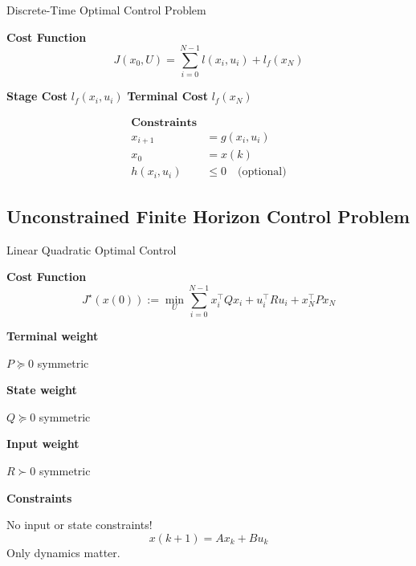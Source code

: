
\begin{sstTitleBox}{
		Discrete-Time Optimal Control Problem
	}
	\begin{sstOnlyFrame}
		\textbf{Cost Function}
		\vspace{-3mm}
		\begin{equation}
			J(x_0,U)= \sum_{i=0}^{N-1} l(x_i,u_i) + l_f(x_N)
		\end{equation}
		\begin{minipage}[t]{0.25\linewidth}
			\textbf{Stage Cost}
			$l_f(x_i,u_i)$
			\textbf{Terminal Cost}
			$l_f(x_N)$
		\end{minipage}
		\begin{minipage}[t]{0.59\linewidth}
			\vspace{-5.5mm}
			\begin{align*}
				\textbf{Constraints}                      \\
				x_{i+1}    & = g(x_i,u_i)                 \\
				x_0        & = x(k)                       \\
				h(x_i,u_i) & \le 0 \quad\text{(optional)}
			\end{align*}
		\end{minipage}
	\end{sstOnlyFrame}
\end{sstTitleBox}



\subsection{Unconstrained Finite Horizon Control Problem}

\begin{sstTitleBox}
	{Linear Quadratic Optimal Control}
	\begin{sstOnlyFrame}
		\textbf{Cost Function}
		\vspace{-3mm}
		\begin{equation}
			J^\star(x(0)) := \min_U
			\sum_{i=0}^{N-1}
			x_i^\top Q x_i + u_i^\top R u_i
			+x_N^\top P x_N
			\label{oc:lq-oc}
		\end{equation}

		\vspace{-2mm}
		\begin{minipage}[t]{0.33\linewidth}
			\textbf{Terminal weight}

			$P\succeq0$ symmetric

			\textbf{State weight}

			$Q\succeq0$ symmetric

			\textbf{Input weight}

			$R\succ0$ symmetric
		\end{minipage}
		\begin{minipage}[t]{0.49\linewidth}
			\textbf{Constraints}

			No input or state constraints!
			\[
				x(k+1)=Ax_k+Bu_k
			\]
			Only dynamics matter.
		\end{minipage}

	\end{sstOnlyFrame}
\end{sstTitleBox}

